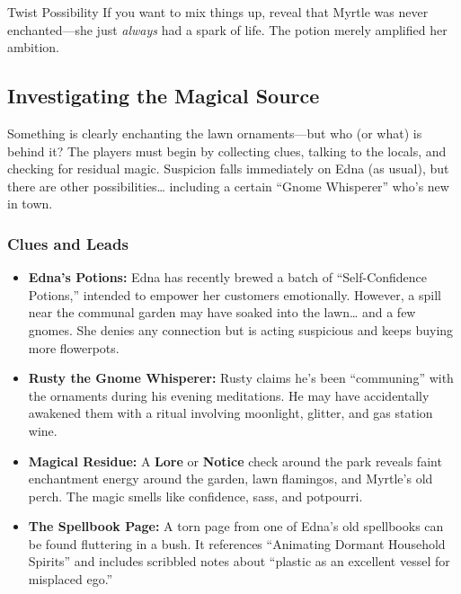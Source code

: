 \begin{CommentBox}{Twist Possibility}
If you want to mix things up, reveal that Myrtle was never enchanted—she just \emph{always} had a spark of life. The potion merely amplified her ambition.
\end{CommentBox}

\subsection{Investigating the Magical Source}

Something is clearly enchanting the lawn ornaments—but who (or what) is behind it? The players must begin by collecting clues, talking to the locals, and checking for residual magic. Suspicion falls immediately on Edna (as usual), but there are other possibilities… including a certain “Gnome Whisperer” who’s new in town.

\subsubsection{Clues and Leads}
\begin{itemize}
    \item \textbf{Edna’s Potions:} Edna has recently brewed a batch of “Self-Confidence Potions,” intended to empower her customers emotionally. However, a spill near the communal garden may have soaked into the lawn… and a few gnomes. She denies any connection but is acting suspicious and keeps buying more flowerpots.
    \item \textbf{Rusty the Gnome Whisperer:} Rusty claims he’s been “communing” with the ornaments during his evening meditations. He may have accidentally awakened them with a ritual involving moonlight, glitter, and gas station wine.
    \item \textbf{Magical Residue:} A \textbf{Lore} or \textbf{Notice}  check around the park reveals faint enchantment energy around the garden, lawn flamingos, and Myrtle’s old perch. The magic smells like confidence, sass, and potpourri.
    \item \textbf{The Spellbook Page:} A torn page from one of Edna’s old spellbooks can be found fluttering in a bush. It references “Animating Dormant Household Spirits” and includes scribbled notes about “plastic as an excellent vessel for misplaced ego.”
\end{itemize}

